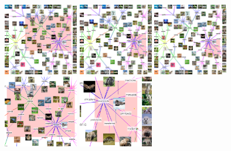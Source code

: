 \documentclass[runningheads,a4paper]{llncs}
\begin{document}
\begin{figure}[t]
 \centering


 \includegraphics[width=0.29\textwidth]{images/autozoom_full_large_red_scaled.png}\hfill%
 \includegraphics[width=0.29\textwidth]{images/autozoom_full_medium_red_scaled.png}\hfill%
 \includegraphics[width=0.29\textwidth]{images/autozoom_full_small_red_scaled.png}%
\vspace{0.1in}
 \includegraphics[width=0.29\textwidth]{images/autozoom_large_red_smaller.png}\hfill%
 \includegraphics[width=0.29\textwidth]{images/autozoom_medium_red_smaller.png}\hfill%

\end{figure}
\end{document}
